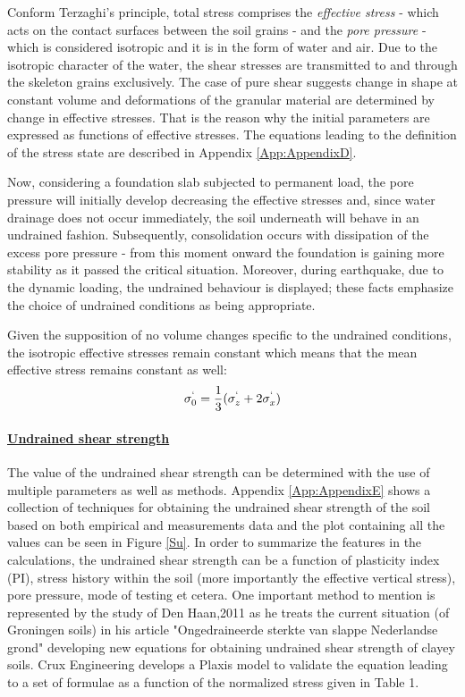 \documentclass[11pt,a4paper]{report}
\begin{document}
Conform Terzaghi's principle, total stress comprises the \textit{effective stress} - which acts on the contact surfaces between the soil grains - and the \textit{pore pressure} - which is considered isotropic and it is in the form of water and air. Due to the isotropic character of the water, the shear stresses are transmitted to and through the skeleton grains exclusively. The case of pure shear suggests change in shape at constant volume and deformations of the granular material are determined by change in effective stresses. That is the reason why the initial parameters are expressed as functions of effective stresses. The equations leading to the definition of the stress state are described in Appendix \ref{App:AppendixD}.

Now, considering a foundation slab subjected to permanent load, the pore pressure will initially develop decreasing the effective stresses and, since water drainage does not occur immediately, the soil underneath will behave in an undrained fashion. Subsequently, consolidation occurs with dissipation of the excess pore pressure - from this moment onward the foundation is gaining more stability as it passed the critical situation. Moreover, during earthquake, due to the dynamic loading, the undrained behaviour is displayed; these facts emphasize the choice of undrained conditions as being appropriate. 

Given the supposition of no volume changes specific to the undrained conditions, the isotropic effective stresses remain constant which means that the mean effective stress remains constant as well:
\begin{equation}
	\sigma^`_0=\frac{1}{3}(\sigma^`_z+2\sigma^`_x)
\end{equation}

\paragraph{\underline{Undrained shear strength}}
The value of the undrained shear strength can be determined with the use of multiple parameters as well as methods. Appendix \ref{App:AppendixE} shows a collection of techniques for obtaining the undrained shear strength of the soil based on both empirical and measurements data and the plot containing all the values can be seen in Figure \ref{Su}. In order to summarize the features in the calculations, the undrained shear strength can be a function of plasticity index (PI), stress history within the soil (more importantly the effective  vertical stress), pore pressure, mode of testing et cetera.
One important method to mention is represented by the study of Den Haan,2011 \cite{den2011ongedraineerde} as he treats the current situation (of Groningen soils) in his article "Ongedraineerde sterkte van slappe Nederlandse grond" developing new equations for obtaining undrained shear strength of clayey soils. Crux Engineering develops a Plaxis model to validate the equation leading to a set of formulae as a function of the normalized stress given in Table 1.
\end{document}
